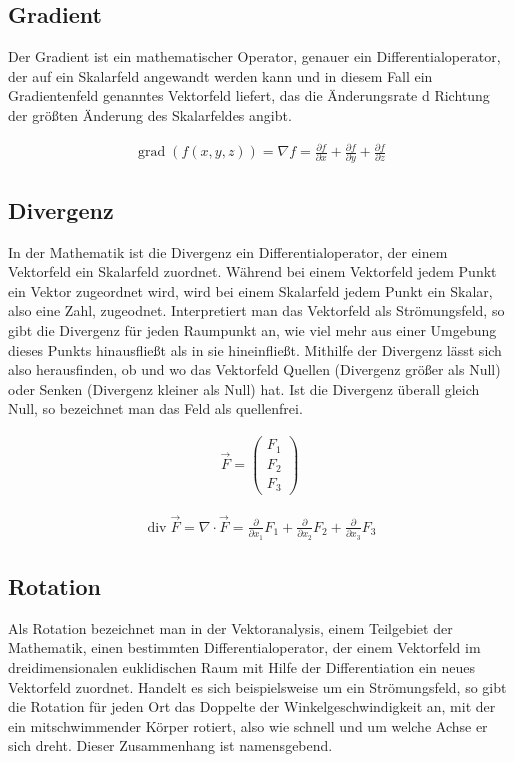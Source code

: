 \documentclass[a4paper]{scrartcl}
\begin{document}
\subsection{Gradient}
Der Gradient ist ein mathematischer Operator, genauer ein Differentialoperator,
der auf ein Skalarfeld angewandt werden kann und in diesem Fall ein
Gradientenfeld genanntes Vektorfeld liefert, das die Änderungsrate d Richtung
der größten Änderung des Skalarfeldes angibt.

\begin{align}
\operatorname{grad}(f(x,y,z)) = \nabla f = \frac{{\partial f}}{{\partial x}} +
\frac{{\partial f}}{{\partial y}} + \frac{{\partial f}}{{\partial z}} 
\end{align}
\subsection{Divergenz}
In der Mathematik ist die Divergenz ein Differentialoperator, der einem
Vektorfeld ein Skalarfeld zuordnet. Während bei einem Vektorfeld jedem Punkt ein
Vektor zugeordnet wird, wird bei einem Skalarfeld jedem Punkt ein Skalar, also
eine Zahl, zugeodnet. Interpretiert man das Vektorfeld als Strömungsfeld, so
gibt die Divergenz für jeden Raumpunkt an, wie viel mehr aus einer Umgebung
dieses Punkts hinausfließt als in sie hineinfließt. Mithilfe der Divergenz lässt
sich also herausfinden, ob und wo das Vektorfeld Quellen (Divergenz größer als
Null) oder Senken (Divergenz kleiner als Null) hat. Ist die Divergenz überall
gleich Null, so bezeichnet man das Feld als quellenfrei.

\begin{align}
\vec F = \begin{pmatrix} F_1 \\ F_2 \\ F_3 \end{pmatrix}
\end{align}

\begin{align}
\operatorname{div}\vec F = \nabla \cdot \vec F =
\frac{\partial}{\partial x_1}F_1 + \frac{\partial}{\partial x_2}F_2+ \frac{\partial}{\partial x_3}F_3
\end{align}

\subsection{Rotation}
Als Rotation bezeichnet man in der Vektoranalysis, einem Teilgebiet der
Mathematik, einen bestimmten Differentialoperator, der einem Vektorfeld im
dreidimensionalen euklidischen Raum mit Hilfe der Differentiation ein neues
Vektorfeld zuordnet. Handelt es sich beispielsweise um ein Strömungsfeld, so
gibt die Rotation für jeden Ort das Doppelte der Winkelgeschwindigkeit an, mit
der ein mitschwimmender Körper rotiert, also wie schnell und um welche Achse er
sich dreht. Dieser Zusammenhang ist namensgebend.
\end{document}
